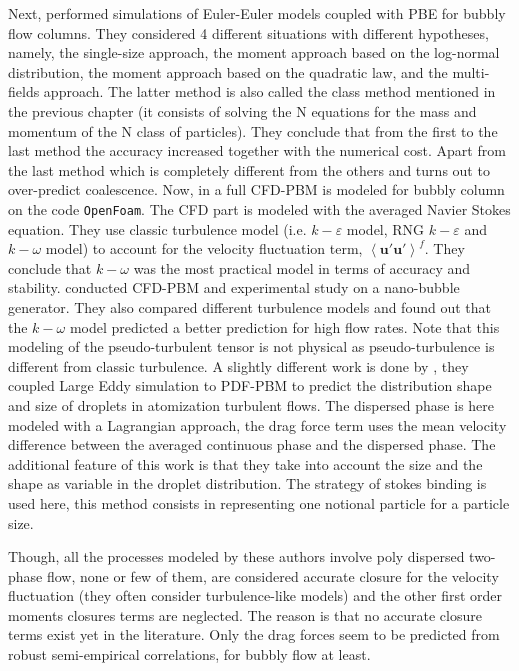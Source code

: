 Next,  \citet{morel2010comparison} performed simulations of Euler-Euler models coupled with PBE for bubbly flow columns. 
They considered 4 different situations with different hypotheses, namely, the single-size approach, the moment approach based on the log-normal distribution, the moment approach based on the quadratic law, and the multi-fields approach.
The latter method is also called the class method mentioned in the previous chapter (it consists of solving the N equations for the mass and momentum of the N class of particles).
They conclude that from the first to the last method the accuracy increased together with the numerical cost.
Apart from the last method which is completely different from the others and turns out to over-predict coalescence. 
Now, in \citet{gemello2018modelling} a full CFD-PBM is modeled for bubbly column on the code \texttt{OpenFoam}. 
The CFD part is modeled with the averaged Navier Stokes equation.
They use classic turbulence model (i.e. $k-\varepsilon$ model, RNG $k-\varepsilon$ and $k-\omega$ model) to account for the velocity fluctuation term, $\left<\bm{u}'\bm{u}'\right>^f$. 
They conclude that $k-\omega$ was the most practical model in terms of accuracy and stability.
\citet{alam2022cfd} conducted CFD-PBM and experimental study on a nano-bubble generator. 
They also compared different turbulence models and found out that the $k-\omega$ model predicted a better prediction for high flow rates.
Note that this modeling of the pseudo-turbulent tensor is not physical as pseudo-turbulence is different from classic turbulence.
A slightly different work is done by \citet{salehi2017population}, they coupled Large Eddy simulation to PDF-PBM to predict the distribution shape and size of droplets in atomization turbulent flows. 
The dispersed phase is here modeled with a Lagrangian approach, the drag force term uses the mean velocity difference between the averaged continuous phase and the dispersed phase.
The additional feature of this work is that they take into account the size and the shape as variable in the droplet distribution.
The strategy of stokes binding is used here, this method consists in representing one notional particle for a particle size.

Though, all the processes modeled by these authors involve poly dispersed two-phase flow, none or few of them, are considered accurate closure for the velocity fluctuation (they often consider turbulence-like models) and the other first order moments closures terms are neglected. 
The reason is that no accurate closure terms exist yet in the literature. 
Only the drag forces seem to be predicted from robust semi-empirical correlations, for bubbly flow at least.

